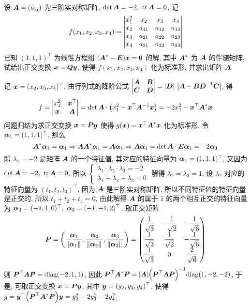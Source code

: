 \begin{example}
    设 $\vb*{A}=(a_{ij})$ 为三阶实对称矩阵, $\det\vb*{A}=-2,~\tr\vb*{A}=0$, 记 $$f(x_1,x_2,x_3,x_4)=\mqty|x_1^2&x_2&x_3&x_4\\x_2&a_{11}&a_{12}&a_{13}\\x_3&a_{21}&a_{22}&a_{23}\\x_4&a_{31}&a_{32}&a_{33}|$$
    已知 $(1,1,1)^\top$ 为线性方程组 $\qty(\vb*{A}^*-\vb*{E})\vb*{x}=\vb*{0}$ 的解, 其中 $\vb*{A}^*$ 为 $\vb*{A}$ 的伴随矩阵, 试给出正交变换 $\vb*{x}=\vb*{Qy}$, 使得 $f(x_1,x_2,x_3,x_4)$ 化为标准形, 并求出矩阵 $\vb*{A}.$
\end{example}
\begin{solution}
    记 $\vb*{x}=(x_2,x_3,x_4)^\top$, 由行列式的降阶公式 $\mqty|\vb*{A}&\vb*{B}\\\vb*{C}&\vb*{D}|=|\vb*{D}|~\qty|\vb*{A}-\vb*{BD}^{-1}\vb*{C}|$, 得
    $$f=\mqty|x_1^2&\vb*{x}^\top\\\vb*{x}&\vb*{A}|=\det\vb*{A}\cdot\qty(x_1^2-\vb*{x}^\top\vb*{A}^{-1}\vb*{x})=-2x_1^2-\vb*{x}^\top\vb*{A}^*\vb*{x}$$
    问题归结为求正交变换 $\vb*{x}=\vb*{Py}$ 使得 $g(\vb*{x})=\vb*{x}^\top\vb*{A}^*\vb*{x}$ 化为标准形, 令 $\vb*{\alpha}_1=(1,1,1)^\top$, 那么
    $$\vb*{A}^*\vb*{\alpha}_1=\vb*{\alpha}_1\Rightarrow \vb*{AA}^*\vb*{\alpha}_1=\vb*{A\alpha}_1\Rightarrow \vb*{A\alpha}_1=\det\vb*{A}\cdot\vb*{E\alpha}_1=-2\vb*{\alpha_1}$$
    即 $\lambda_1=-2$ 是矩阵 $\vb*{A}$ 的一个特征值, 其对应的特征向量为 $\vb*{\alpha}_1=(1,1,1)^\top$, 又因为 $\det\vb*{A}=-2,~\tr\vb*{A}=0$, 所以 $\begin{cases}
            \lambda_1\cdot\lambda_2\cdot\lambda_3=-2 \\
            \lambda_1+\lambda_2+\lambda_3=0
        \end{cases}$ 解得 $\lambda_2=\lambda_3=1$, 设 $\lambda_2$ 对应的特征向量为 $(t_1,t_2,t_3)^\top$, 因为 $\vb*{A}$ 是三阶实对称矩阵, 所以不同特征值的特征向量是正交的, 所以 $t_1+t_2+t_3=0$, 由此解得 $\vb*{A}$ 的属于 1 的两个相互正交的特征向量为 $\vb*{\alpha}_2=(-1,1,0)^\top,~\vb*{\alpha}_3=(-1,-1,2)^\top$, 取正交矩阵
    $$\vb*{P}=\qty(\dfrac{\vb*{\alpha}_1}{\norm*{\vb*{\alpha}_1}},\dfrac{\vb*{\alpha}_2}{\norm*{\vb*{\alpha}_2}},\dfrac{\vb*{\alpha}_3}{\norm*{\vb*{\alpha}_3}})=\mqty(\dfrac{1}{\sqrt{3}}&-\dfrac{1}{\sqrt{2}}&-\dfrac{1}{\sqrt{6}}\\[6pt]\dfrac{1}{\sqrt{3}}&\dfrac{1}{\sqrt{2}}&-\dfrac{1}{\sqrt{6}}\\[6pt]\dfrac{1}{\sqrt{3}}&0&\dfrac{2}{\sqrt{6}})$$
    则 $\vb*{P}^\top\vb*{AP}=\mathrm{diag}(-2,1,1)$, 因此 $\vb*{P}^\top\vb*{A}^*\vb*{P}=|\vb*{A}|\qty(\vb*{P}^\top\vb*{AP})^{-1}\mathrm{diag}(1,-2,-2)$, 于是, 可取正交变换 $\vb*{x}=\vb*{Py}$, 其中 $\vb*{y}=(y_2,y_3,y_4)^\top$, 使得 $g=\vb*{y}^\top\qty(\vb*{P}^\top\vb*{A}^*\vb*{P})\vb*{y}=y_2^2-2y_3^2-2y_4^2$, 

\end{solution}
